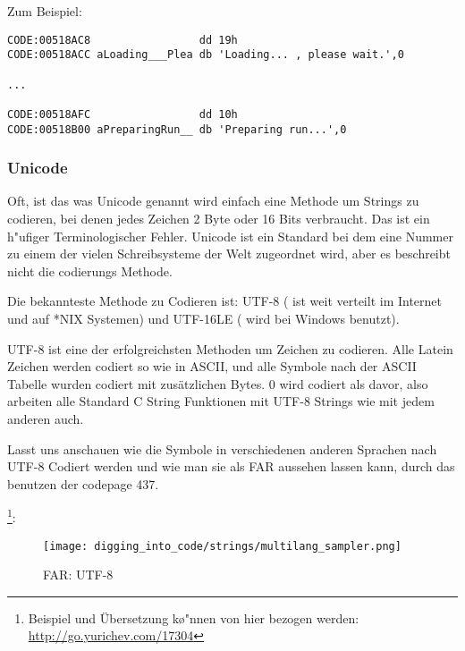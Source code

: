 Zum Beispiel:

\begin{lstlisting}[caption=Delphi,style=customasmx86]
CODE:00518AC8                 dd 19h
CODE:00518ACC aLoading___Plea db 'Loading... , please wait.',0

...

CODE:00518AFC                 dd 10h
CODE:00518B00 aPreparingRun__ db 'Preparing run...',0
\end{lstlisting}

\subsubsection{Unicode}


Oft, ist das was Unicode genannt wird einfach eine Methode um Strings zu codieren, bei denen jedes Zeichen 2 Byte oder 
16 Bits verbraucht. Das ist ein h\a"ufiger Terminologischer Fehler. Unicode ist ein Standard bei dem eine Nummer 
zu einem der vielen Schreibsysteme der Welt zugeordnet wird, aber es beschreibt nicht die codierungs Methode. 


Die bekannteste Methode zu Codieren ist: UTF-8 ( ist weit verteilt im Internet und auf *NIX Systemen) und UTF-16LE ( wird bei Windows benutzt). 


UTF-8 ist eine der erfolgreichsten Methoden um Zeichen zu codieren.
Alle Latein Zeichen werden codiert so wie in ASCII, und alle Symbole nach der
ASCII Tabelle wurden codiert mit zus\"atzlichen Bytes. 0 wird codiert als davor,
also arbeiten alle Standard C String Funktionen mit UTF-8 Strings wie mit jedem anderen auch.

Lasst uns anschauen wie die Symbole in verschiedenen anderen Sprachen nach UTF-8 Codiert werden und 
wie man sie als FAR aussehen lassen kann, durch das benutzen der codepage 437.

\footnote{Beispiel und \"Ubersetzung k\o"nnen von hier bezogen werden:  
\url{http://go.yurichev.com/17304}}:

\begin{figure}[H]
\centering
\texttt{[image: digging\_into\_code/strings/multilang\_sampler.png]}
\end{figure}

\begin{figure}[H]
\centering
{}
\caption{FAR: UTF-8}
\end{figure}


